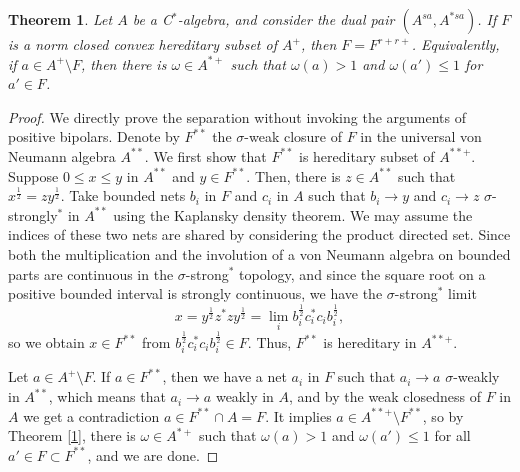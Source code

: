 \documentclass[noamsfonts,a4paper,10pt]{amsart}
\theoremstyle{plain}
\newtheorem{thm}{Theorem}[section]
\theoremstyle{definition}
\theoremstyle{remark}
\begin{document}
\begin{thm}
Let $A$ be a C$^*$-algebra, and consider the dual pair $(A^{sa},A^{*sa})$.
If $F$ is a norm closed convex hereditary subset of $A^+$, then $F=F^{r+r+}$.
Equivalently, if $a\in A^+\setminus F$, then there is $\omega\in A^{*+}$ such that $\omega(a)>1$ and $\omega(a')\le1$ for $a'\in F$.
\end{thm}
\begin{proof}
We directly prove the separation without invoking the arguments of positive bipolars.
Denote by $F^{**}$ the $\sigma$-weak closure of $F$ in the universal von Neumann algebra $A^{**}$.
We first show that $F^{**}$ is hereditary subset of $A^{**+}$.
Suppose $0\le x\le y$ in $A^{**}$ and $y\in F^{**}$.
Then, there is $z\in A^{**}$ such that $x^{\frac12}=zy^{\frac12}$.
Take bounded nets $b_i$ in $F$ and $c_i$ in $A$ such that $b_i\to y$ and $c_i\to z$ $\sigma$-strongly$^*$ in $A^{**}$ using the Kaplansky density theorem.
We may assume the indices of these two nets are shared by considering the product directed set.
Since both the multiplication and the involution of a von Neumann algebra on bounded parts are continuous in the $\sigma$-strong$^*$ topology, and since the square root on a positive bounded interval is strongly continuous, we have the $\sigma$-strong$^*$ limit
\[x=y^{\frac12}z^*zy^{\frac12}=\lim_ib_i^{\frac12}c_i^*c_ib_i^{\frac12},\]
so we obtain $x\in F^{**}$ from $b_i^{\frac12}c_i^*c_ib_i^{\frac12}\in F$.
Thus, $F^{**}$ is hereditary in $A^{**+}$.

Let $a\in A^+\setminus F$.
If $a\in F^{**}$, then we have a net $a_i$ in $F$ such that $a_i\to a$ $\sigma$-weakly in $A^{**}$, which means that $a_i\to a$ weakly in $A$, and by the weak closedness of $F$ in $A$ we get a contradiction $a\in F^{**}\cap A=F$.
It implies $a\in A^{**+}\setminus F^{**}$, so by Theorem \ref{1}, there is $\omega\in A^{*+}$ such that $\omega(a)>1$ and $\omega(a')\le1$ for all $a'\in F\subset F^{**}$, and we are done.
\end{proof}
\end{document}
